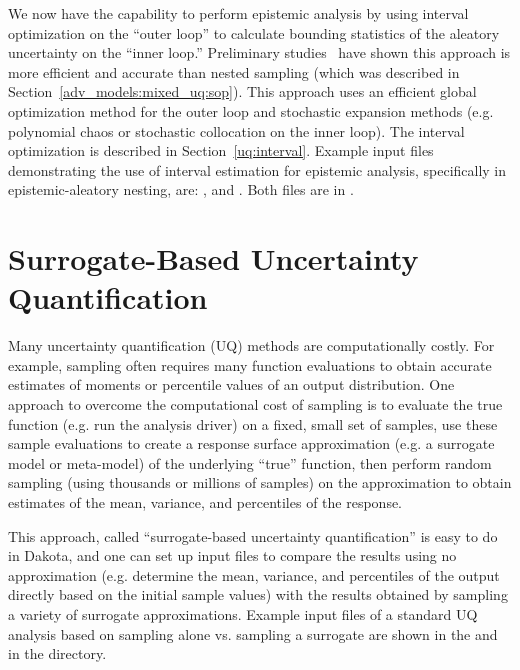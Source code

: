 We now have the capability to perform epistemic analysis by 
using interval optimization on the ``outer loop'' to calculate bounding 
statistics of the aleatory uncertainty on the ``inner loop.''  
Preliminary studies~\cite{Eld09b} have shown this approach is more efficient 
and accurate than nested sampling (which was described in 
Section~\ref{adv_models:mixed_uq:sop}). This approach uses 
an efficient global optimization method for the outer loop and 
stochastic expansion methods (e.g. polynomial chaos or stochastic 
collocation on the inner loop). The interval optimization is described in 
Section~\ref{uq:interval}. Example input files demonstrating 
the use of interval estimation for epistemic analysis, 
specifically in epistemic-aleatory nesting, are: 
, and
. Both files are in
.

\section{Surrogate-Based Uncertainty Quantification} \label{adv_models:sbuq}

Many uncertainty quantification (UQ) methods are computationally costly. 
For example, sampling often requires many function evaluations to obtain 
accurate estimates of moments or percentile values of an output distribution. 
One approach to overcome the computational cost of sampling is to 
evaluate the true function (e.g. run the analysis driver) on a fixed, small
set of samples, use these sample evaluations to 
create a response surface approximation (e.g. a surrogate model or meta-model)
of the underlying ``true'' function, then perform random sampling (using 
thousands or millions of samples) on the approximation to obtain estimates 
of the mean, variance, and percentiles of the response. 

This approach, called ``surrogate-based uncertainty quantification'' 
is easy to do in Dakota, and one can set up input files to compare the 
results using no approximation (e.g. determine the mean, variance, and 
percentiles of the output directly based on the initial sample values) 
with the results obtained by sampling a variety of surrogate approximations. 
Example input files of a standard UQ analysis based on sampling alone vs. 
sampling a surrogate are shown in the  and
 in the 
directory.


